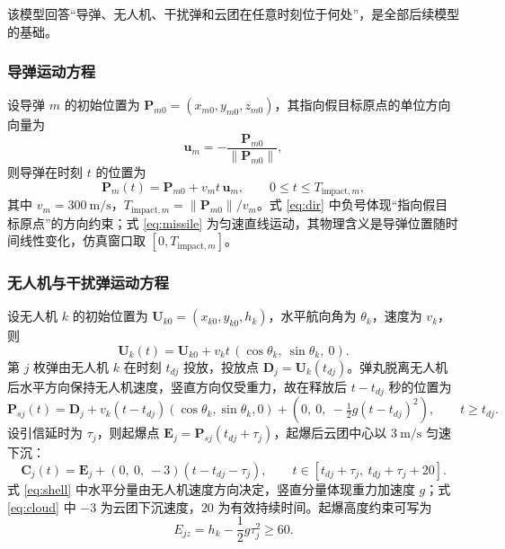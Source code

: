\documentclass[11pt,a4paper]{ctexart}
\begin{document}
该模型回答“导弹、无人机、干扰弹和云团在任意时刻位于何处”，是全部后续模型的基础。

\subsubsection{导弹运动方程}

设导弹 $m$ 的初始位置为 $\bm{P}_{m0}=(x_{m0},y_{m0},z_{m0})$，其指向假目标原点的单位方向向量为
\begin{equation}
  \bm{u}_m = -\frac{\bm{P}_{m0}}{\|\bm{P}_{m0}\|},
  \label{eq:dir}
\end{equation}
则导弹在时刻 $t$ 的位置为
\begin{equation}
  \bm{P}_m(t) = \bm{P}_{m0} + v_m t\,\bm{u}_m, \qquad 0\le t\le T_{\mathrm{impact},m},
  \label{eq:missile}
\end{equation}
其中 $v_m=300~\mathrm{m/s}$，$T_{\mathrm{impact},m}=\|\bm{P}_{m0}\|/v_m$。式 \eqref{eq:dir} 中负号体现“指向假目标原点”的方向约束；式 \eqref{eq:missile} 为匀速直线运动，其物理含义是导弹位置随时间线性变化，仿真窗口取 $[0,T_{\mathrm{impact},m}]$。

\subsubsection{无人机与干扰弹运动方程}

设无人机 $k$ 的初始位置为 $\bm{U}_{k0}=(x_{k0},y_{k0},h_k)$，水平航向角为 $\theta_k$，速度为 $v_k$，则
\begin{equation}
  \bm{U}_k(t)=\bm{U}_{k0}+v_k t\,(\cos\theta_k,\ \sin\theta_k,\ 0).
  \label{eq:uav}
\end{equation}
第 $j$ 枚弹由无人机 $k$ 在时刻 $t_{dj}$ 投放，投放点 $\bm{D}_j=\bm{U}_k(t_{dj})$。弹丸脱离无人机后水平方向保持无人机速度，竖直方向仅受重力，故在释放后 $t-t_{dj}$ 秒的位置为
\begin{equation}
  \bm{P}_{sj}(t)=\bm{D}_j + v_k(t-t_{dj})(\cos\theta_k,\sin\theta_k,0)
  +\left(0,\ 0,\ -\tfrac{1}{2}g(t-t_{dj})^2\right), \qquad t\ge t_{dj}.
  \label{eq:shell}
\end{equation}
设引信延时为 $\tau_j$，则起爆点 $\bm{E}_j=\bm{P}_{sj}(t_{dj}+\tau_j)$，起爆后云团中心以 $3~\mathrm{m/s}$ 匀速下沉：
\begin{equation}
  \bm{C}_j(t)=\bm{E}_j+\left(0,\ 0,\ -3\right)\left(t-t_{dj}-\tau_j\right), \qquad
  t\in\left[t_{dj}+\tau_j,\ t_{dj}+\tau_j+20\right].
  \label{eq:cloud}
\end{equation}
式 \eqref{eq:shell} 中水平分量由无人机速度方向决定，竖直分量体现重力加速度 $g$；式 \eqref{eq:cloud} 中 $-3$ 为云团下沉速度，$20$ 为有效持续时间。起爆高度约束可写为
\begin{equation}
  E_{jz}=h_k-\frac{1}{2}g\tau_j^2\ge 60.
  \label{eq:height}
\end{equation}
\end{document}
